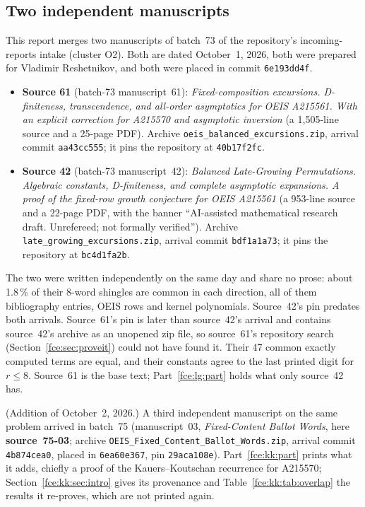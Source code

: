 \documentclass[11pt,a4paper]{article}
\numberwithin{equation}{section}
\theoremstyle{definition}\newtheorem{definition}[theorem]{Definition}
\theoremstyle{remark}\newtheorem{remark}[theorem]{Remark}
\begin{document}
\subsection{Two independent manuscripts}\label{fce:sec:sources}
This report merges two manuscripts of batch~73 of the repository's
incoming-reports intake (cluster O2). Both are dated October~1, 2026,
both were prepared for Vladimir Reshetnikov, and both were placed in
commit \texttt{6e193dd4f}.
\begin{itemize}
\item \textbf{Source 61} (batch-73 manuscript~61): \emph{Fixed-composition
excursions. D-finiteness, transcendence, and all-order asymptotics for OEIS
A215561. With an explicit correction for A215570 and asymptotic inversion}
(a 1{,}505-line source and a 25-page PDF). Archive
\texttt{oeis\_balanced\_excursions.zip}, arrival commit
\texttt{aa43cc555}; it pins the repository at
\texttt{40b17f2fc}.
\item \textbf{Source 42} (batch-73 manuscript~42): \emph{Balanced
Late-Growing Permutations. Algebraic constants, D-finiteness, and complete
asymptotic expansions. A proof of the fixed-row growth conjecture for OEIS
A215561} (a 953-line source and a 22-page PDF, with the banner
``AI-assisted mathematical research draft. Unrefereed; not formally
verified''). Archive \texttt{late\_growing\_excursions.zip}, arrival commit
\texttt{bdf1a1a73}; it pins the repository at \texttt{bc4d1fa2b}.
\end{itemize}
The two were written independently on the same day and share no prose:
about 1.8\,\% of their 8-word shingles are common in each direction, all
of them bibliography entries, OEIS rows and kernel polynomials. Source~42's
pin predates both arrivals. Source~61's pin is later than source~42's
arrival and contains source~42's archive as an unopened zip file, so
source~61's repository search (Section~\ref{fce:sec:proveit}) could not
have found it. Their 47 common exactly computed terms are equal, and their
constants agree to the last printed digit for $r\le8$. Source~61 is the
base text; Part~\ref{fce:lg:part} holds what only source~42 has.

(Addition of October~2, 2026.) A third independent manuscript on the same
problem arrived in batch~75 (manuscript~03, \emph{Fixed-Content Ballot
Words}, here \textbf{source~75-03}; archive
\texttt{OEIS\_Fixed\_Content\_Ballot\_Words.zip}, arrival commit
\texttt{4b874cea0}, placed in \texttt{6ea60e367}, pin \texttt{29aca108e}).
Part~\ref{fce:kk:part} prints what it adds, chiefly a proof of the
Kauers--Koutschan recurrence for A215570; Section~\ref{fce:kk:sec:intro}
gives its provenance and Table~\ref{fce:kk:tab:overlap} the results it
re-proves, which are not printed again.
\end{document}
